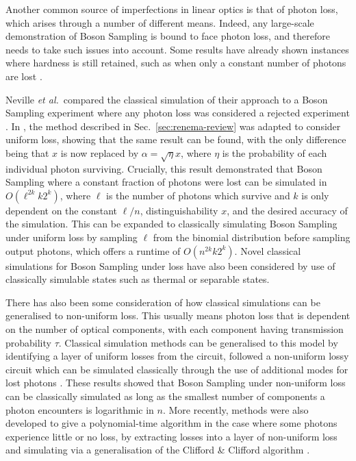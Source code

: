 Another common source of imperfections in linear optics is that of photon loss, which arises through a number of different means. 
Indeed, any large-scale demonstration of Boson Sampling is bound to face photon loss, and therefore needs to take such issues into account. 
Some results have already shown instances where hardness is still retained, such as when only a constant number of photons are lost \cite{aaronson2016,wang2018}.

Neville \textit{et al.}\ compared the classical simulation of their approach to a Boson Sampling experiment where any photon loss was considered a rejected experiment \cite{neville2017}. 
In \cite{renema2018loss}, the method described in Sec.\ \ref{sec:renema-review} was adapted to consider uniform loss, showing that the same result can be found, with the only difference being that $x$ is now replaced by $\alpha=\sqrt{\eta}x$, where $\eta$ is the probability of each individual photon surviving. 
Crucially, this result demonstrated that Boson Sampling where a constant fraction of photons were lost can be simulated in $O(\ell^{2k}k2^k)$, where $\ell$ is the number of photons which survive and $k$ is only dependent on the constant $\ell/n$, distinguishability $x$, and the desired accuracy of the simulation. 
This can be expanded to classically simulating Boson Sampling under uniform loss by sampling $\ell$ from the binomial distribution before sampling output photons, which offers a runtime of $O(n^{2k}k2^k)$. 
Novel classical simulations for Boson Sampling under loss have also been considered by use of classically simulable states such as thermal \cite{garciapatron2017} or separable \cite{oszmaniec2018} states.

There has also been some consideration of how classical simulations can be generalised to non-uniform loss. 
This usually means photon loss that is dependent on the number of optical components, with each component having transmission probability $\tau$. 
Classical simulation methods can be generalised to this model by identifying a layer of uniform losses from the circuit, followed a non-uniform lossy circuit which can be simulated classically through the use of additional modes for lost photons \cite{garciapatron2017,oszmaniec2018}. 
These results showed that Boson Sampling under non-uniform loss can be classically simulated as long as the smallest number of components a photon encounters is logarithmic in $n$. More recently, methods were also developed to give a polynomial-time algorithm in the case where some photons experience little or no loss, by extracting losses into a layer of non-uniform loss and simulating via a generalisation of the Clifford \& Clifford algorithm \cite{brod2019}.

